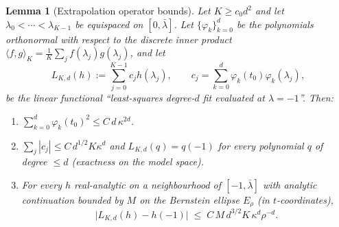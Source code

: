 \documentclass[11pt]{article}
\theoremstyle{plain}
\newtheorem{lemma}{Lemma}
\theoremstyle{definition}
\begin{document}
\begin{lemma}[Extrapolation operator bounds]\label{app:lem:extrap}
Let $K\ge c_0d^2$ and let $\lambda_0<\cdots<\lambda_{K-1}$ be equispaced
on $[0,\bar\lambda]$. Let $\{\varphi_k\}_{k=0}^{d}$ be the polynomials
orthonormal with respect to the discrete inner product
$\langle f,g\rangle_K=\frac1K\sum_jf(\lambda_j)g(\lambda_j)$, and let
\[
  L_{K,d}(h):=\sum_{j=0}^{K-1}c_jh(\lambda_j),
  \qquad
  c_j=\sum_{k=0}^{d}\varphi_k(t_0)\varphi_k(\lambda_j),
\]
be the linear functional ``least-squares degree-$d$ fit evaluated at
$\lambda=-1$''. Then:
\begin{enumerate}\itemsep2pt
\item[(i)] $\displaystyle\sum_{k=0}^{d}\varphi_k(t_0)^2\le C\,d\,\kappa^{2d}$.
\item[(ii)] $\displaystyle\sum_j|c_j|\le C\,d^{1/2}K\kappa^{d}$ and
      $L_{K,d}(q)=q(-1)$ for every polynomial $q$ of degree $\le d$
      (exactness on the model space).
\item[(iii)] For every $h$ real-analytic on a neighbourhood of
      $[-1,\bar\lambda]$ with analytic continuation bounded by $M$ on the
      Bernstein ellipse $E_\rho$ (in $t$-coordinates),
      \[
        \bigl|L_{K,d}(h)-h(-1)\bigr|\;\le\;C\,M\,d^{3/2}K\,\kappa^{d}\rho^{-d}.
      \]
\end{enumerate}
\end{lemma}
\end{document}
